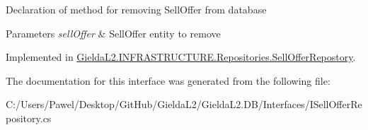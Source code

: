 Declaration of method for removing Sell\+Offer from database 


\begin{DoxyParams}{Parameters}
{\em sell\+Offer} & Sell\+Offer entity to remove\\
\hline
\end{DoxyParams}


Implemented in \mbox{\hyperlink{class_gielda_l2_1_1_i_n_f_r_a_s_t_r_u_c_t_u_r_e_1_1_repositories_1_1_sell_offer_repostory_ad66a43f51403182c2c341f8fcfc77715}{Gielda\+L2.\+I\+N\+F\+R\+A\+S\+T\+R\+U\+C\+T\+U\+R\+E.\+Repositories.\+Sell\+Offer\+Repostory}}.



The documentation for this interface was generated from the following file\+:\begin{DoxyCompactItemize}
\item 
C\+:/\+Users/\+Pawel/\+Desktop/\+Git\+Hub/\+Gielda\+L2/\+Gielda\+L2.\+D\+B/\+Interfaces/I\+Sell\+Offer\+Repository.\+cs\end{DoxyCompactItemize}
